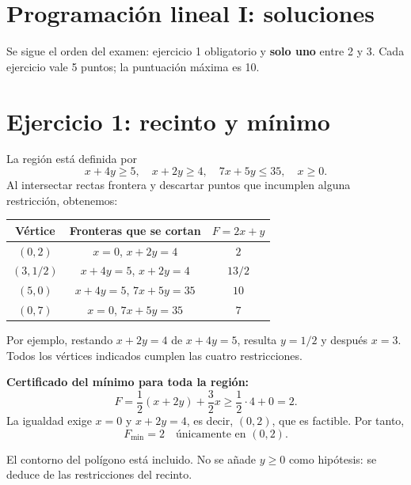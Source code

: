 \documentclass[11pt]{article}
\begin{document}
\section*{Programación lineal I: soluciones}
Se sigue el orden del examen: ejercicio 1 obligatorio y \textbf{solo uno} entre 2 y 3. Cada ejercicio vale 5 puntos; la puntuación máxima es 10.
\section*{Ejercicio 1: recinto y mínimo}
La región está definida por
\[x+4y\geq5,\quad x+2y\geq4,\quad7x+5y\leq35,\quad x\geq0.\]
Al intersectar rectas frontera y descartar puntos que incumplen alguna restricción, obtenemos:
\begin{center}
\begin{tabular}{c|c|c}
Vértice & Fronteras que se cortan & $F=2x+y$\\\hline
$(0,2)$ & $x=0$, $x+2y=4$ & $2$\\
$(3,1/2)$ & $x+4y=5$, $x+2y=4$ & $13/2$\\
$(5,0)$ & $x+4y=5$, $7x+5y=35$ & $10$\\
$(0,7)$ & $x=0$, $7x+5y=35$ & $7$
\end{tabular}
\end{center}
Por ejemplo, restando $x+2y=4$ de $x+4y=5$, resulta $y=1/2$ y después $x=3$. Todos los vértices indicados cumplen las cuatro restricciones.

\textbf{Certificado del mínimo para toda la región:}
\[F=\frac12(x+2y)+\frac32x\geq\frac12\cdot4+0=2.\]
La igualdad exige $x=0$ y $x+2y=4$, es decir, $(0,2)$, que es factible. Por tanto,
\[\boxed{F_{\min}=2\quad\text{únicamente en }(0,2)}.\]
\begin{center}
\end{center}
El contorno del polígono está incluido. No se añade $y\geq0$ como hipótesis: se deduce de las restricciones del recinto.
\clearpage
\end{document}
